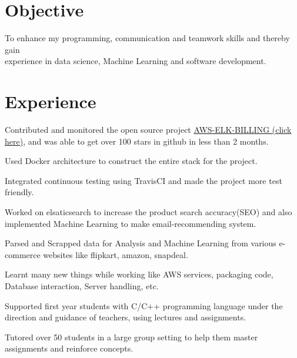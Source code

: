 \documentclass[]{sagar_resume}
\begin{document}
\begin{minipage}[t]{0.66\textwidth} 


\section{Objective}
To enhance my programming, communication and teamwork skills and thereby gain\\experience in data science, Machine Learning and software development. 

\section{Experience}
\vspace{\topsep} %
\begin{tightemize}
\item Contributed and monitored the open source project \href{https://github.com/PriceBoardIn/aws-elk-billing}{ AWS-ELK-BILLING (click here)}, and was able to get over 100 stars in github in less than 2 months.
\item Used Docker architecture to construct the entire stack for the project.
\item Integrated continuous testing using TravisCI and made the project more test friendly. 
\item Worked on elsaticsearch to increase the product search accuracy(SEO) and also implemented Machine Learning to make email-recommending system.
\item Parsed and Scrapped data for Analysis and Machine Learning from various e-commerce websites like flipkart, amazon, snapdeal.
\item Learnt many new things while working like AWS services, packaging code, Database interaction, Server handling, etc.
\end{tightemize}
\sectionsep

\begin{tightemize}
\item Supported first year students with C/C++ programming language under the direction and guidance of teachers, using lectures  and assignments.
\item Tutored over 50 students in a large group setting to help them master assignments and reinforce concepts.
\end{tightemize}
\sectionsep


\end{minipage}
\end{document}
